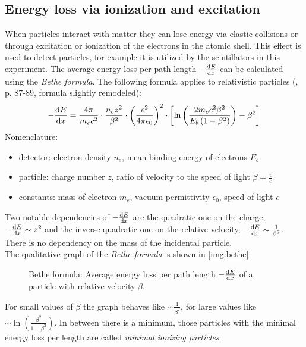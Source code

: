 \subsection{Energy loss via ionization and excitation}
When particles interact with matter they can lose energy via elastic collisions or through excitation or ionization of the electrons in the 
atomic shell. This effect is used to detect particles, for example it is utilized by the scintillators in this experiment. The average energy loss per path length 
$-\frac{\mathrm{d} E}{\mathrm{d} x}$ can be calculated using the \emph{Bethe formula}. The following formula applies to relativistic particles (\cite{dem4}, p. 87-89, formula slightly remodeled):
\begin{equation}
    - \frac{\mathrm{d} E}{\mathrm{d} x} = \frac{4 \pi}{m_e c^2} \cdot \frac{n_e z^2}{\beta^2} \cdot \left( \frac{e^2}{4 \pi \epsilon_0} \right)^2 \cdot \left[ \ln \left( \frac{2 m_e c^2 \beta^2}{E_b \left( 1-\beta^2 \right)  } \right) - \beta^2 \right]
\end{equation}
Nomenclature: 
\begin{itemize}
  \item detector: electron density $n_e$, mean binding energy of electrons $E_b$
  \item particle: charge number $z$, ratio of velocity to the speed of light $\beta = \frac{v}{c}$
  \item constants: mass of electron $m_e$, vacuum permittivity $\epsilon_0$, speed of light $c$
\end{itemize}
Two notable dependencies of $-\frac{\mathrm{d} E}{\mathrm{d} x}$ are the quadratic one on the charge, $-\frac{\mathrm{d} E}{\mathrm{d} x} \sim z^2$ and the inverse 
quadratic one on the relative velocity, $-\frac{\mathrm{d} E}{\mathrm{d} x} \sim \frac{1}{\beta^2}$. There is no dependency on the mass of the incidental 
particle.\\
The qualitative graph of the \emph{Bethe formula} is shown in \autoref{img:bethe}. 
\begin{figure}[H]
        \centering
        \def\svgwidth{0.55\textwidth} 
       
        \caption{Bethe formula: Average energy loss per path length $-\frac{\mathrm{d} E}{\mathrm{d} x}$ of a particle with relative velocity $\beta$.}
        \label{img:bethe}
\end{figure}
For small values of $\beta$ the graph behaves like $\sim \frac{1}{\beta^2}$, for large values like 
$\sim \ln \left( \frac{\beta^2}{1-\beta^2} \right)$. In between there is a minimum, those particles with the minimal energy loss per length are called 
\emph{minimal ionizing particles}.
